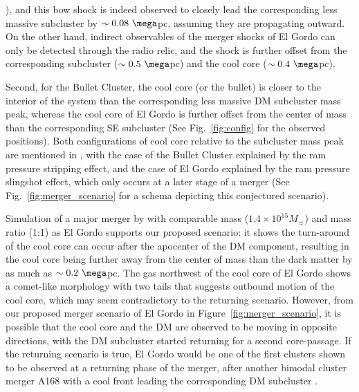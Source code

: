 \documentclass[ucdthesis.tex]{subfiles}
\begin{document}
    \citealt{Markevitch2007}), and this bow shock is indeed observed to closely
    lead the corresponding less massive subcluster by $\sim 0.08~\mega$pc,
    assuming they are propagating outward. On the other hand, indirect
    observables of the merger shocks of El Gordo can only be detected through the radio relic, and the shock is
    further offset from the corresponding subcluster ($\sim 0.5~\mega$pc) and
    the cool core ($\sim 0.4~\mega$pc). \par
    Second, for the Bullet Cluster, the cool core (or the bullet) is closer to the
    interior of the system than the corresponding less massive DM subcluster mass
    peak, whereas the cool core of El Gordo is further offset from the center of
    mass than the corresponding SE subcluster (See Fig.~\ref{fig:config} for
    the observed positions). 
    Both configurations of cool core relative to the subcluster mass peak are
    mentioned in \cite{Markevitch2007}, with the case of the Bullet Cluster
    explained by the ram pressure stripping effect, and the case of El Gordo
    explained by the ram pressure slingshot effect, which only occurs at a
    later stage of a merger (See Fig.~\ref{fig:merger_scenario} for a schema depicting this conjectured scenario).\par 
    Simulation of a major merger by
    \cite{Mathis05} with comparable mass ($1.4 \times 10^{15} M_{\sun}$) and
    mass ratio (1:1) as El Gordo supports
    our proposed scenario: it shows the turn-around of the cool core can occur after the
    apocenter of the DM component, resulting in the cool core being further
    away from the center of mass than the dark matter by as much as $\sim
    0.2~\mega$pc.  The gas northwest of the cool core of El Gordo shows a comet-like
    morphology with two tails that suggests outbound motion of the cool core, which may seem
    contradictory to the returning scenario. However, from our proposed merger
    scenario of El Gordo in Figure~\ref{fig:merger_scenario},
    it is possible that the cool core and the DM are observed to be moving in
    opposite directions, with the DM subcluster started returning for a second core-passage. If the returning scenario is true, El Gordo would be one of the first
    clusters shown to be observed at a returning phase of the merger, after another
    bimodal cluster merger A168 with a cool front leading the corresponding DM
    subcluster \citep{Hallman04}.
    
\end{document}

